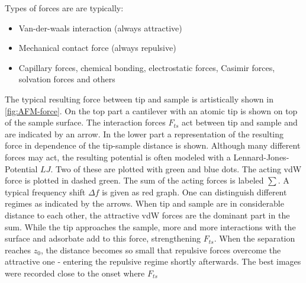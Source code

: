 Types of forces are are typically:
\begin{itemize}
 \item Van-der-waals interaction (always attractive)
 \item Mechanical contact force (always repulsive)
 \item Capillary forces, chemical bonding, electrostatic forces, Casimir forces, solvation forces and others
\end{itemize}

The typical resulting force between tip and sample is artistically shown in \autoref{fig:AFM-force}. On the top part a cantilever with an atomic tip is shown on top of the sample surface. The interaction forces $F_{ts}$ act between tip and sample and are indicated by an arrow. In the lower part a representation of the resulting force in dependence of the tip-sample distance is shown. Although many different forces may act, the resulting potential is often modeled with a Lennard-Jones-Potential $LJ$\cite{jones_determination_1924}. Two of these are plotted with green and blue dots. The acting vdW force is plotted in dashed green. The sum of the acting forces is labeled $\sum$. A typical frequency shift $\Delta f$ is given as red graph. One can distinguish different regimes as indicated by the arrows. When tip and sample are in considerable distance to each other, the attractive vdW forces are the dominant part in the sum. While the tip approaches the sample, more and more interactions with the surface and adsorbate add to this force, strengthening $F_{ts}$. When the separation reaches $z_0$, the distance becomes so small that repulsive forces overcome the attractive one - entering the repulsive regime shortly afterwards. The best images were recorded close to the onset where $F_{ts}$ 

